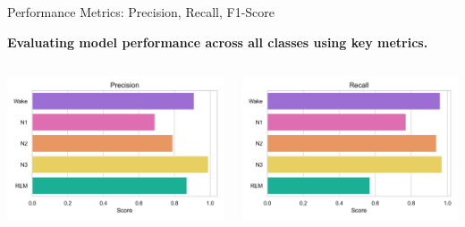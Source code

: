 \begin{frame}{Performance Metrics: Precision, Recall, F1-Score}

    \centering
    \textbf{Evaluating model performance across all classes using key metrics.}
    
    \vspace{10pt} %

    \begin{columns}
        \centering
        \includegraphics[width=\linewidth]{figures/precision_plot.png} %

        \centering
        \includegraphics[width=\linewidth]{figures/recall_plot.png} %


\end{columns}
\end{frame}
